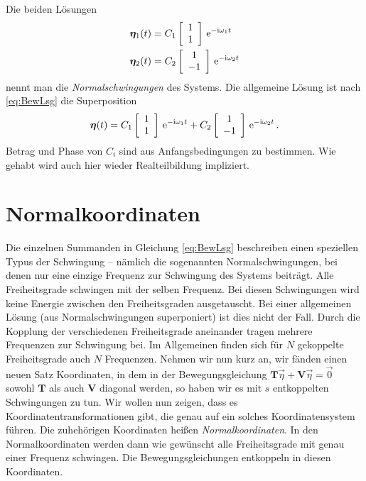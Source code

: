 \documentclass[paper=a4, fontsize=11.0pt, abstractoff, DIV12]{scrartcl}
\begin{document}
Die beiden Lösungen
\begin{align}
{\ensuremath{\boldsymbol{\eta}}}_1(t) &= C_1 \left[ \begin{array}{c} 1 \\ 1 \end{array} \right]\,{\mathrm{e}}^{-\mathrm{i}\omega_1 t}\\
{\boldsymbol{\eta}}_2(t) &= C_2 \left[ \begin{array}{c} 1 \\ -1 \end{array} \right]\,{\mathrm{e}}^{-\mathrm{i} \omega_2 t}
\end{align}
nennt man die \emph{Normalschwingungen} des Systems. Die
allgemeine Lösung ist nach \eqref{eq:BewLsg} die Superposition
\begin{equation}
{\ensuremath{\boldsymbol{\eta}}}(t) = C_1 \left[ \begin{array}{c} 1 \\ 1 \end{array} \right]\,{\mathrm{e}}^{-\mathrm{i}\omega_1 t} + C_2 \left[ \begin{array}{c} 1 \\ -1 \end{array} \right]\,{\mathrm{e}}^{-\mathrm{i} \omega_2 t}\, .
\end{equation}
Betrag und Phase von $C_i$ sind aus Anfangsbedingungen zu bestimmen. Wie
gehabt wird auch hier wieder Realteilbildung impliziert.

\section{Normalkoordinaten}

Die einzelnen Summanden in Gleichung \eqref{eq:BewLsg} beschreiben einen
speziellen Typus der Schwingung -- nämlich die sogenannten
Normalschwingungen, bei denen nur eine einzige Frequenz zur Schwingung des
Systems beiträgt. Alle Freiheitsgrade schwingen mit der selben Frequenz. Bei
diesen Schwingungen wird keine Energie zwischen den Freiheitsgraden
ausgetauscht. Bei einer allgemeinen Lösung (aus Normalschwingungen
superponiert) ist dies nicht der Fall. Durch die Kopplung der verschiedenen
Freiheitsgrade aneinander tragen mehrere Frequenzen zur Schwingung bei. Im
Allgemeinen finden sich für $N$ gekoppelte Freiheitsgrade auch $N$
Frequenzen. Nehmen wir nun kurz an, wir fänden einen neuen Satz Koordinaten,
in dem in der Bewegungsgleichung $\mathbf{T} \ddot{\vec\eta} +
\mathbf{V}{\vec\eta} = \vec 0$ sowohl $\mathbf{T}$ als auch $\mathbf{V}$
diagonal werden, so haben wir es mit $s$ entkoppelten Schwingungen zu tun.
Wir wollen nun zeigen, dass es Koordinatentransformationen gibt, die genau
auf ein solches Koordinatensystem führen. Die zuhehörigen Koordinaten heißen
\emph {Normalkoordinaten}. In den Normalkoordinaten werden dann wie
gewünscht alle Freiheitsgrade mit genau einer Frequenz schwingen. Die
Bewegungsgleichungen entkoppeln in diesen Koordinaten.
\end{document}
